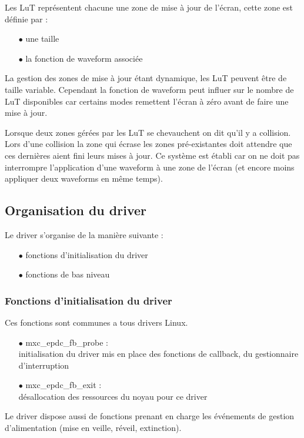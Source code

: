 Les LuT représentent chacune une zone de mise à jour de l'écran, cette zone est définie par : 
	\begin{itemize}
		\item[$\bullet$] une taille
		\item[$\bullet$] la fonction de waveform associée
	\end{itemize}
La gestion des zones de mise à jour étant dynamique, les LuT peuvent être de taille variable. Cependant la fonction de waveform peut influer sur le nombre de LuT disponibles car certains modes remettent l'écran à zéro avant de faire une mise à jour.

Lorsque deux zones gérées par les LuT se chevauchent on dit qu'il y a collision. Lors d'une collision 
la zone qui écrase les zones pré-existantes doit attendre que ces dernières aient fini leurs mises à jour. Ce système est établi car on ne doit pas interrompre l'application d'une waveform à une zone de l'écran (et encore moins appliquer deux waveforms en même temps).
\subsection{Organisation du driver}

Le driver s'organise de la manière suivante : 
	\begin{itemize}
		\item[$\bullet$] fonctions d'initialisation du driver
		\item[$\bullet$] fonctions de bas niveau
	\end{itemize}
	
\subsubsection{Fonctions d'initialisation du driver} %

	Ces fonctions sont communes a tous drivers Linux.
	\begin{itemize}
		\item[$\bullet$] mxc\_epdc\_fb\_probe : \\
		initialisation du driver mis en place des fonctions de callback, du gestionnaire d'interruption
		\item[$\bullet$] mxc\_epdc\_fb\_exit :\\
		désallocation des ressources du noyau pour ce driver
	\end{itemize}
	Le driver dispose aussi de fonctions prenant en charge les événements de gestion d'alimentation (mise en veille, réveil, extinction).
	

